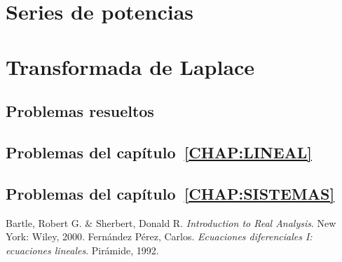 \documentclass[draft, a4paper, 10pt, openany]{book}
\begin{document}
\chapter{Series de potencias}
\label{CHAP:SERIES}


\chapter{Transformada de Laplace}
\label{CHAP:LAPLACE}


\begin{appendices}

\chapter{Problemas resueltos}

\section{Problemas del capítulo~\ref{CHAP:LINEAL}}


\section{Problemas del capítulo~\ref{CHAP:SISTEMAS}}


\end{appendices}

\backmatter

\listoffigures

\listoftables

\begin{thebibliography}{9}
		Bartle, Robert G. \& Sherbert, Donald R.
		\textit{Introduction to Real Analysis}. 
		New York: Wiley, 2000. 
        Fernández Pérez, Carlos.
        \textit{Ecuaciones diferenciales I: ecuaciones lineales}.
        Pirámide, 1992.
\end{thebibliography}
\end{document}
